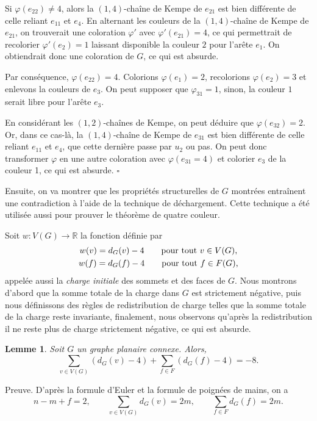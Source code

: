 \documentclass[10pt,a4paper]{article}
\newtheorem{lemme}{Lemme}
\newcommand{\ep}{{\hfill $\square$}}
\begin{document}
Si $\varphi(e_{22}) \ne 4$, alors la $(1,4)$-chaîne de Kempe de $e_{21}$ est bien différente de celle reliant $e_{11}$ et $e_4$. En alternant les couleurs de la $(1,4)$-chaîne de Kempe de $e_{21}$, on trouverait une coloration $\varphi'$ avec $\varphi'(e_{21})=4$, ce qui permettrait de recolorier $\varphi'(e_2) = 1$ laissant disponible la couleur $2$ pour l'arête $e_1$. On obtiendrait donc une coloration de $G$, ce qui est absurde. 

Par conséquence, $\varphi(e_{22}) = 4$. Colorions $\varphi(e_1)=2$, recolorions $\varphi(e_2)=3$ et enlevons la couleurs de $e_3$.
On peut supposer que $\varphi_{31}=1$, sinon, la couleur $1$ serait libre pour l'arête $e_3$.

En considérant les $(1,2)$-chaînes de Kempe, on peut déduire que $\varphi(e_{32})=2$. Or, dans ce cas-là, la $(1,4)$-chaîne de Kempe de $e_{31}$ est bien différente de celle reliant $e_{11}$ et $e_4$, que cette dernière passe par $u_2$ ou pas. On peut donc transformer $\varphi$ en une autre coloration avec $\varphi(e_{31}=4)$ et colorier $e_3$ de la couleur 1, ce qui est absurde.
\ep


\bigskip
Ensuite, on va montrer que les propriétés structurelles de $G$ montrées entraînent une contradiction à l'aide de la technique de déchargement. Cette technique a été utilisée aussi pour prouver le théorème de quatre couleur. 

Soit $w: V(G) \to \mathbb{R}$  la fonction définie par
 $$
 \gathered
 w(v) = d_G(v) - 4 \qquad \textrm{pour tout $v\in V(G)$,} \\
 w(f) = d_G(f) - 4 \qquad \textrm{pour tout $f\in F(G)$,} 
\endgathered 
$$
appelée aussi la \emph{charge initiale} des sommets et des faces de $G$. Nous montrons d'abord que la somme totale de la charge dans $G$ est strictement négative, puis nous définissons des règles de redistribution de charge telles que la somme totale de la charge reste invariante, finalement, nous observons qu'après la redistribution il ne reste plus de charge strictement négative, ce qui est absurde.

\begin{lemme}
Soit $G$ un graphe planaire connexe. Alors,
$$ \sum_{v \in V(G)} (d_G(v) - 4) + \sum_{f\in F} (d_G(f) -4) = -8.$$
\label{le:charge}
\end{lemme}

Preuve.
D'après la formule d'Euler et la formule de poignées de mains, on a
$$ 
n - m + f = 2, \qquad
\sum_{v\in V(G)} d_G(v) = 2m, \qquad
\sum_{f\in F} d_G(f) = 2m. 
$$
\end{document}
